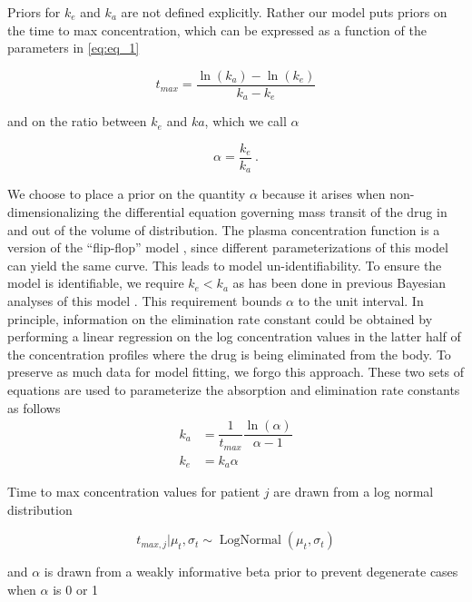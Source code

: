 Priors for $k_e$ and $k_a$ are not defined explicitly.  Rather our model puts priors on the time to max concentration, which can be expressed as a function of the parameters in \cref{eq:eq_1}

\begin{equation}\label{eq:eq_2}
 t_{max} = \dfrac{\ln(k_a) - \ln(k_e)}{k_a - k_e}
\end{equation}

\noindent and on the ratio between $k_e$ and $ka$, which we call $\alpha$

\begin{equation}\label{eq:eq_3}
\alpha  = \dfrac{k_e}{k_a} \>.
\end{equation}

\noindent We choose to place a prior on the quantity $\alpha$ because it arises when non-dimensionalizing \cite{Lin1988-pr} the differential equation governing mass transit of the drug in and out of the volume of distribution.  The plasma concentration function is a version of the “flip-flop” model \cite{Wakefield1996-yy, Salway2008-gi}, since different parameterizations of this model can yield the same curve.  This leads to model un-identifiability. To ensure the model is identifiable, we require $k_e<k_a$ as has been done in previous Bayesian analyses of this model \cite{Wakefield1996-yy, Salway2008-gi}. This requirement bounds $\alpha$ to the unit interval.  In principle, information on the elimination rate constant could be obtained by performing a linear regression on the log concentration values in the latter half of the concentration profiles where the drug is being eliminated from the body. To preserve as much data for model fitting, we forgo this approach.  These two sets of equations are used to parameterize the absorption and elimination rate constants as follows
\begin{align}
	k_a &= \dfrac{1}{t_{max}} \dfrac{\ln(\alpha)}{\alpha-1} \label{eq:eq_4} \\
	k_e &= k_a \alpha \label{eq:eq_5}
\end{align}

Time to max concentration values for patient $j$ are drawn from a log normal distribution

\begin{equation}\label{eq:eq_6}
t_{max, j} \vert \mu_t, \sigma_t \sim \operatorname{LogNormal}(\mu_t, \sigma_t)
\end{equation}

\noindent and $\alpha$ is drawn from a weakly informative beta prior to prevent degenerate cases when $\alpha$  is 0 or 1

